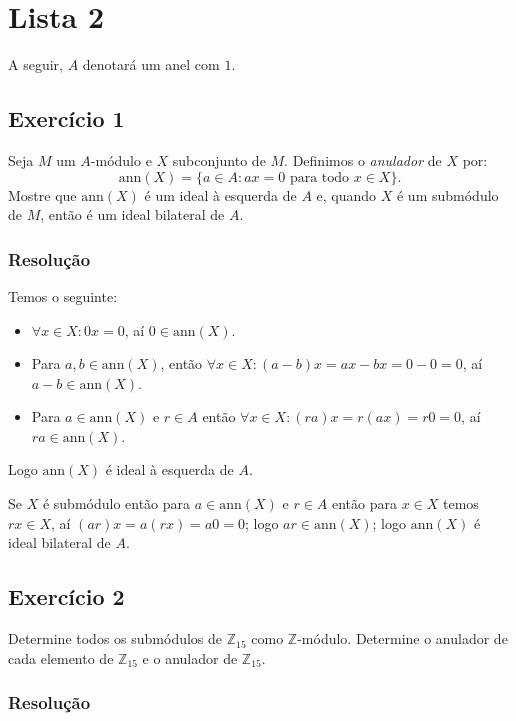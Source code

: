 \documentclass[10pt,a4paper]{article}
\begin{document}
\newpage

\section*{Lista 2}

A seguir, $A$ denotará um anel com $1$.

\subsection*{Exercício 1}

Seja $M$ um $A$-módulo e $X$ subconjunto de $M$. Definimos o \textit{anulador} de $X$ por:
\[
\mathrm{ann}(X)=\{a\in A:ax=0\text{ para todo }x\in X\}.
\]
Mostre que $\mathrm{ann}(X)$ é um ideal à esquerda de $A$ e, quando $X$ é um submódulo de $M$, então é um ideal bilateral de $A$.

\subsubsection*{Resolução}

Temos o seguinte:
\begin{itemize}
\item $\forall x\in X:0x=0$, aí $0\in\mathrm{ann}(X)$.
\item Para $a,b\in\mathrm{ann}(X)$, então $\forall x\in X:(a-b)x=ax-bx=0-0=0$, aí $a-b\in\mathrm{ann}(X)$.
\item Para $a\in\mathrm{ann}(X)$ e $r\in A$ então $\forall x\in X:(ra)x=r(ax)=r0=0$, aí $ra\in\mathrm{ann}(X)$.
\end{itemize}
Logo $\mathrm{ann}(X)$ é ideal à esquerda de $A$.

\medskip
\noindent
Se $X$ é submódulo então para $a\in\mathrm{ann}(X)$ e $r\in A$ então para $x\in X$ temos $rx\in X$, aí $(ar)x=a(rx)=a0=0$; logo $ar\in\mathrm{ann}(X)$; logo $\mathrm{ann}(X)$ é ideal bilateral de $A$.

\subsection*{Exercício 2}

Determine todos os submódulos de $\mathbb{Z}_{15}$ como $\mathbb{Z}$-módulo. Determine o anulador de cada elemento de $\mathbb{Z}_{15}$ e o anulador de $\mathbb{Z}_{15}$.

\subsubsection*{Resolução}
\end{document}
